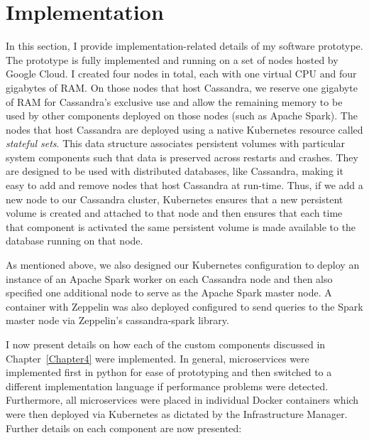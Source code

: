 
\chapter{Implementation} %

\label{Chapter5} %

In this section, I provide implementation-related details of my software prototype. The prototype is fully implemented and running on a set of nodes hosted by Google Cloud. I created four nodes in total, each with one virtual CPU and four gigabytes of RAM. On those nodes that host Cassandra, we reserve one gigabyte of RAM for Cassandra’s exclusive use and allow the remaining memory to be used by other components deployed on those nodes (such as Apache Spark). The nodes that host Cassandra are deployed using a native Kubernetes resource called \textit{stateful sets}. This data structure associates persistent volumes with particular system components such that data is preserved across restarts and crashes. They are designed to be used with distributed databases, like Cassandra, making it easy to add and remove nodes that host Cassandra at run-time. Thus, if we add a new node to our Cassandra cluster, Kubernetes ensures that a new persistent volume is created and attached to that node and then ensures that each time that component is activated the same persistent volume is made available to the database running on that node.

As mentioned above, we also designed our Kubernetes configuration to deploy an instance of an Apache Spark worker on each Cassandra node and then also specified one additional node to serve as the Apache Spark master node. A container with Zeppelin was also deployed configured to send queries to the Spark master node via Zeppelin’s cassandra-spark library.

I now present details on how each of the custom components discussed in Chapter~\ref{Chapter4} were implemented. In general, microservices were implemented first in python for ease of prototyping and then switched to a different implementation language if performance problems were detected. Furthermore, all microservices were placed in individual Docker containers which were then deployed via Kubernetes as dictated by the Infrastructure Manager. Further details on each component are now presented:

